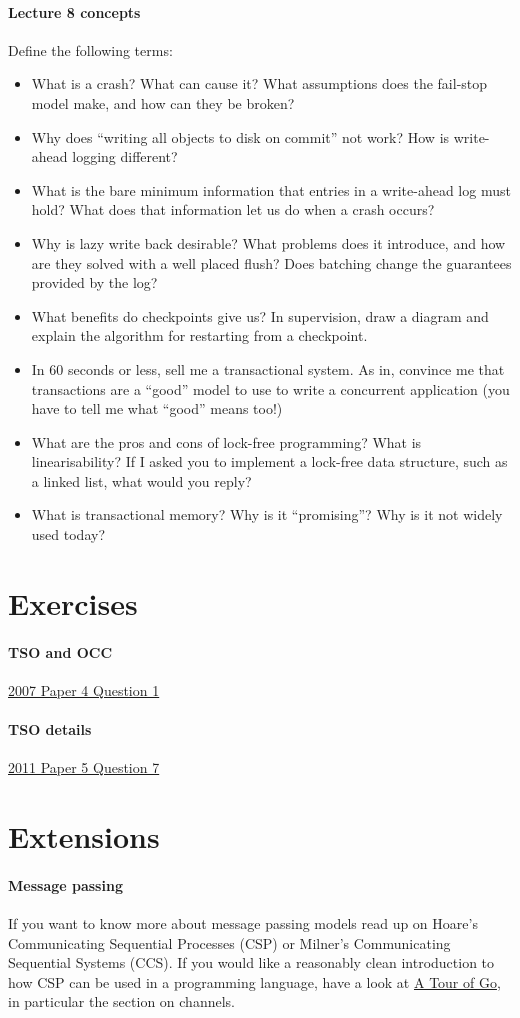 \documentclass[12pt,a4paper,oneside,openright]{report}
\newcommand{\question}[2]{\paragraph{#1} #2}
\begin{document}
\question{Lecture 8 concepts}{Define the following terms:
  \begin{itemize}
  \item What is a crash? What can cause it? What assumptions does the
    fail-stop model make, and how can they be broken?
  \item Why does ``writing all objects to disk on commit'' not work?
    How is write-ahead logging different?
  \item What is the bare minimum information that entries in a
    write-ahead log must hold? What does that information let us do
    when a crash occurs?
  \item Why is lazy write back desirable? What problems does it
    introduce, and how are they solved with a well placed flush? Does
    batching change the guarantees provided by the log?
  \item What benefits do checkpoints give us? In supervision, draw a
    diagram and explain the algorithm for restarting from a
    checkpoint.
  \item In 60 seconds or less, sell me a transactional system. As in,
    convince me that transactions are a ``good'' model to use to write
    a concurrent application (you have to tell me what ``good'' means
    too!)
  \item What are the pros and cons of lock-free programming? What is
    linearisability? If I asked you to implement a lock-free data
    structure, such as a linked list, what would you reply?
  \item What is transactional memory? Why is it ``promising''? Why is
    it not widely used today?
  \end{itemize}
}


\section{Exercises}

\question{TSO and
  OCC}{\href{https://www.cl.cam.ac.uk/teaching/exams/pastpapers/y2007p4q1.pdf}{2007
    Paper 4 Question 1}}

\question{TSO
  details}{\href{https://www.cl.cam.ac.uk/teaching/exams/pastpapers/y2011p5q7.pdf}{2011
    Paper 5 Question 7}}

\section{Extensions}

\question{Message passing}{If you want to know more about message
  passing models read up on Hoare's Communicating Sequential Processes
  (CSP) or Milner's Communicating Sequential Systems (CCS). If you
  would like a reasonably clean introduction to how CSP can be used in
  a programming language, have a look at
  \href{https://tour.golang.org}{A Tour of Go}, in particular the
  section on channels.}
\end{document}
